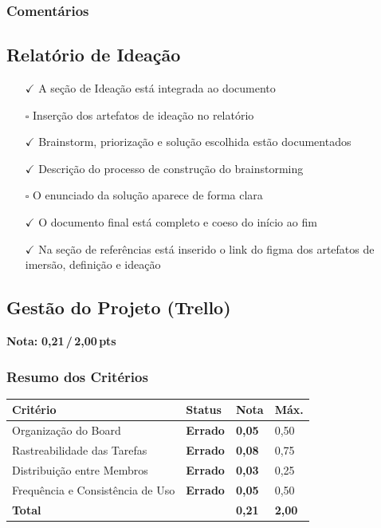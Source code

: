 \documentclass[
  sigconf,
  nonacm, %
  language=portuguese
]{acmart}
\newcommand{\notadestaque}[2]{%
  \noindent\textbf{Nota:}\enspace%
  {\large\bfseries\color{cred}#1\,/\,#2\,pts}%
}
\newcommand{\statuswarn}[1]{{\small\bfseries\color{cwarn}#1}}
\begin{document}
\subsubsection*{Comentários}

\subsection{Relatório de Ideação}

\noindent\statuswarn{0,65\,/\,1,00 pts · Faltou pouco}

\begin{itemize}[leftmargin=14pt,itemsep=1pt,topsep=3pt,parsep=0pt]
  \item[\textcolor{cgood}{$\checkmark$}] {\small\textcolor{cgood}{A seção de Ideação está integrada ao documento}}
  \item[$\square$] {\small\textcolor{cmuted}{Inserção dos artefatos de ideação no relatório}}
  \item[\textcolor{cgood}{$\checkmark$}] {\small\textcolor{cgood}{Brainstorm, priorização e solução escolhida estão documentados}}
  \item[\textcolor{cgood}{$\checkmark$}] {\small\textcolor{cgood}{Descrição do processo de construção do brainstorming}}
  \item[$\square$] {\small\textcolor{cmuted}{O enunciado da solução aparece de forma clara}}
  \item[\textcolor{cgood}{$\checkmark$}] {\small\textcolor{cgood}{O documento final está completo e coeso do início ao fim}}
  \item[\textcolor{cgood}{$\checkmark$}] {\small\textcolor{cgood}{Na seção de referências está inserido o link do figma dos artefatos de imersão, definição e ideação}}
\end{itemize}

\subsection{Gestão do Projeto (Trello)}

\notadestaque{0,21}{2,00}

\subsubsection*{Resumo dos Critérios}

\begin{tabular}{@{} L{2.6cm} C{2.5cm} C{1.1cm} C{1.1cm} @{}}
\toprule
\textbf{Critério} & \textbf{Status} & \textbf{Nota} & \textbf{Máx.} \\
\midrule
Organização do Board & \statuswarn{Errado} & \textbf{0,05} & 0,50 \\
Rastreabilidade das Tarefas & \statuswarn{Errado} & \textbf{0,08} & 0,75 \\
Distribuição entre Membros & \statuswarn{Errado} & \textbf{0,03} & 0,25 \\
Frequência e Consistência de Uso & \statuswarn{Errado} & \textbf{0,05} & 0,50 \\
\midrule
\textbf{Total} & & \textbf{\color{cred}0,21} & \textbf{2,00} \\
\bottomrule
\end{tabular}
\end{document}
